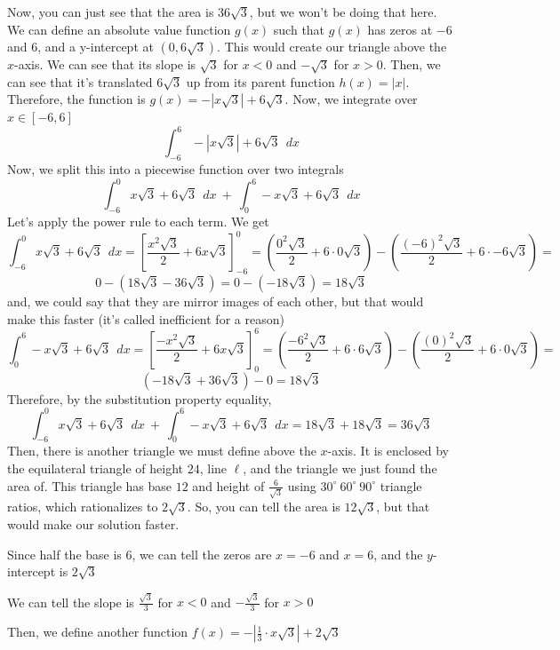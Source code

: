 \begin{enumerate}
 Now, you can just see that the area is $36\sqrt{3}$, but we won't be doing that here. We can define an absolute value function $g(x)$ such that $g(x)$ has zeros at $-6$ and $6$, and a y-intercept at $(0, 6\sqrt{3})$. This would create our triangle above the $x$-axis. We can see that its slope is $\sqrt{3}$ for $x<0$ and $-\sqrt{3}$ for $x>0$. Then, we can see that it's translated $6\sqrt{3}$ up from its parent function $h(x)=|x|$. Therefore, the function is $g(x) = -|x\sqrt{3}|+6\sqrt{3}$. Now, we integrate over $x\in[-6, 6]$
 \[\int_{-6}^{6} -|x\sqrt{3}|+6\sqrt{3} \ \  dx\]Now, we split this into a piecewise function over two integrals
 \[\int_{-6}^{0} x\sqrt{3}+6\sqrt{3} \ \  dx \ + \ \int_{0}^{6} -x\sqrt{3}+6\sqrt{3} \ \  dx\]Let's apply the power rule to each term. We get
 \[\int_{-6}^{0} x\sqrt{3}+6\sqrt{3} \ \ dx= \left[\frac{x^2\sqrt3}{2}+6x\sqrt{3} \right]_{-6}^0 = \left(\frac{0^2\sqrt3}{2}+6\cdot0\sqrt{3}\right) - \left(\frac{(-6)^2\sqrt3}{2}+6\cdot-6\sqrt{3}\right) =\]
 \[0 - (18\sqrt{3} - 36\sqrt3) = 0 - (-18\sqrt{3}) = 18\sqrt{3}\]and, we could say that they are mirror images of each other, but that would make this faster (it's called inefficient for a reason)
 \[\int_{0}^{6} -x\sqrt{3}+6\sqrt{3} \ \  dx = \left[\frac{-x^2\sqrt3}{2}+6x\sqrt{3} \right]_{0}^6 = \left(\frac{-6^2\sqrt3}{2}+6\cdot6\sqrt{3}\right) - \left(\frac{(0)^2\sqrt3}{2}+6\cdot0\sqrt{3}\right) =\]
 \[(-18\sqrt{3}+36\sqrt{3}) - 0 = 18\sqrt{3}\]Therefore, by the substitution property equality,
 \[\int_{-6}^{0} x\sqrt{3}+6\sqrt{3} \ \  dx \ + \ \int_{0}^{6} -x\sqrt{3}+6\sqrt{3} \ \  dx = 18\sqrt{3}+18\sqrt{3}=36\sqrt{3}\]Then, there is another triangle we must define above the $x$-axis. It is enclosed by the equilateral triangle of height $24$, line $\ell$, and the triangle we just found the area of. This triangle has base $12$ and height of $\frac{6}{\sqrt{3}}$ using $30^\circ \ 60^\circ \ 90^\circ$ triangle ratios, which rationalizes to $2\sqrt{3}$. So, you can tell the area is $12\sqrt{3}$, but that would make our solution faster.

 Since half the base is $6$, we can tell the zeros are $x= -6$ and $x=6$, and the $y$-intercept is $2\sqrt{3}$ 

 We can tell the slope is $\frac{\sqrt{3}}{3}$ for $x<0$ and $-\frac{\sqrt{3}}{3}$ for $x>0$

 Then, we define another function $f(x)= -|\frac{1}{3} \cdot x\sqrt{3}| + 2\sqrt{3}$


\end{enumerate}
